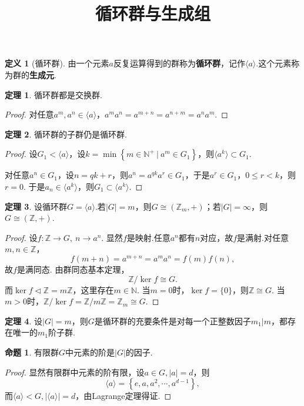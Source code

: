 \documentclass[12pt]{ctexart}
\title{\vspace{-2em}\textbf{循环群与生成组}\vspace{-2em}}
\date{ }
\theoremstyle{definition}
\newtheorem{definition}{定义}
\newtheorem{theorem}{定理}
\newtheorem{proposition}{命题}
\theoremstyle{plain}
\begin{document}
	\maketitle
	\begin{definition}[循环群]
		由一个元素$a$反复运算得到的群称为\textbf{循环群}，记作$\langle a\rangle$.这个元素称为群的\textbf{生成元}.
	\end{definition}
	\begin{theorem}
		循环群都是交换群.
	\end{theorem}
	\begin{proof}
		对任意$a^m,a^n\in\langle a\rangle$，$a^ma^n=a^{m+n}=a^{n+m}=a^na^m$.
	\end{proof}
	\begin{theorem}
		循环群的子群仍是循环群.
	\end{theorem}
	\begin{proof}
		设$G_1<\langle a\rangle$，设$k=\min\left\{m\in\mathbb{N}^{+}\ |\ a^m\in G_1\right\}$，则$\langle a^k\rangle\subset G_1$.
		
		对任意$a^n\in G_1$，设$n=qk+r$，则$a^n=a^{qk}a^r\in G_1$，于是$a^r\in G_1$，$0\leqslant r<k$，则$r=0$. 于是$a_n\in\langle a^k\rangle$，则$G_1\subset\langle a^k\rangle$.
	\end{proof}
	\begin{theorem}
		设循环群$G=\langle a\rangle$.若$|G|=m$，则$G\cong(\mathbb{Z}_m,+)$；若$|G|=\infty$，则$G\cong(\mathbb{Z},+)$.
	\end{theorem}
	\begin{proof}
		设$f:\mathbb{Z}\to G,\ n\to a^n$. 显然$f$是映射.任意$a^n$都有$n$对应，故$f$是满射.对任意$m,n\in\mathbb{Z}$，
		$$f(m+n)=a^{m+n}=a^ma^n=f(m)f(n),$$
		故$f$是满同态. 由群同态基本定理，
		$$\mathbb{Z}/\ker f\cong G.$$
		而$\ker f\lhd\mathbb{Z}=m\mathbb{Z}$，这里存在$m\in\mathbb{N}$. 当$m=0$时，$\ker f=\{0\}$，则$\mathbb{Z}\cong G$. 当$m>0$时，$\mathbb{Z}/\ker f=\mathbb{Z}/m\mathbb{Z}=\mathbb{Z}_m\cong G$.
	\end{proof}
	\begin{theorem}
		设$|G|=m$，则$G$是循环群的充要条件是对每一个正整数因子$m_1|m$，都存在唯一的$m_1$阶子群.
	\end{theorem}
	\begin{proposition}
		有限群$G$中元素的阶是$|G|$的因子.
	\end{proposition}
	\begin{proof}
		显然有限群中元素的阶有限，设$a\in G,|a|=d$，则
		$$\langle a\rangle=\left\{e,a,a^2,\cdots,a^{d-1}\right\},$$
		而$\langle a\rangle<G,|\langle a\rangle|=d$，由Lagrange定理得证.
	\end{proof}
\end{document}
